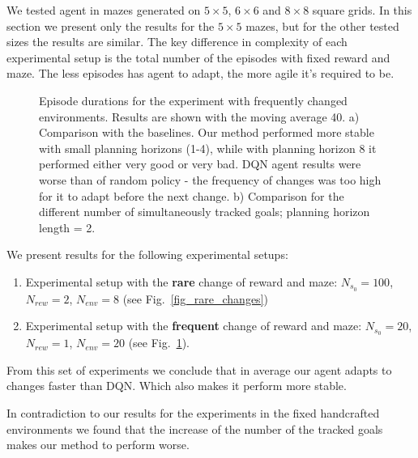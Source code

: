 \documentclass[a4paper,twoside]{article}
\begin{document}
We tested agent in mazes generated on $5 \times 5$, $6 \times 6$ and $8 \times 8$ square grids. In this section we present only the results for the $5 \times 5$ mazes, but for the other tested sizes the results are similar. The key difference in complexity of each experimental setup is the total number of the episodes with fixed reward and maze. The less episodes has agent to adapt, the more agile it's required to be.

\begin{figure}
  \centering
  \begin{minipage}{\linewidth}
    
    \subcaption{}
    \vspace*{10pt}

    
    \subcaption{}
    \vspace*{4pt}
  \end{minipage}

  \caption{Episode durations for the experiment with frequently changed environments. Results are shown with the moving average 40. a) Comparison with the baselines. Our method performed more stable with small planning horizons (1-4), while with planning horizon 8 it performed either very good or very bad. DQN agent results were worse than of random policy - the frequency of changes was too high for it to adapt before the next change. b) Comparison for the different number of simultaneously tracked goals; planning horizon length = 2.} \label{fig_frequent_changes}
\end{figure}

We present results for the following experimental setups:

\begin{enumerate}
  \item Experimental setup with the \textbf{rare} change of reward and maze: $N_{s_0} = 100$, $N_{rew} = 2$, $N_{env} = 8$ (see Fig.~\ref{fig_rare_changes})

  \item Experimental setup with the \textbf{frequent} change of reward and maze: $N_{s_0} = 20$, $N_{rew} = 1$, $N_{env} = 20$ (see Fig.~\ref{fig_frequent_changes}).
\end{enumerate}

From this set of experiments we conclude that in average our agent adapts to changes faster than DQN. Which also makes it perform more stable.

In contradiction to our results for the experiments in the fixed handcrafted environments we found that the increase of the number of the tracked goals makes our method to perform worse.
\end{document}
